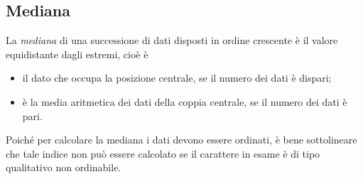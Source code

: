 \subsection{Mediana}
\begin{definizione}
La \emph{mediana} di una successione di dati disposti in ordine crescente è il valore equidistante dagli estremi, cioè è
\begin{itemize}
\item il dato che occupa la posizione centrale, se il numero dei dati è dispari;
\item è la media aritmetica dei dati della coppia centrale, se il numero dei dati è pari.
\end{itemize}
\end{definizione}

Poiché per calcolare la mediana i dati devono essere ordinati, è bene sottolineare che tale indice non può essere calcolato se il carattere in esame è di tipo qualitativo non ordinabile.

